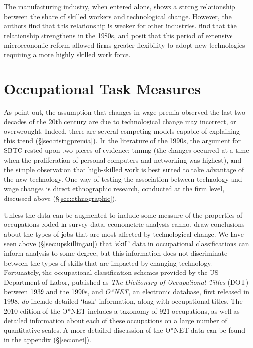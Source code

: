 The manufacturing industry, when entered alone, shows a strong relationship between the share of skilled workers and technological change. However, the authors find that this relationship is weaker for other industries.  find that the relationship strengthens in the 1980s, and posit that this period of extensive microeconomic reform allowed firms greater flexibility to adopt new technologies requiring a more highly skilled work force.


\section{Occupational Task Measures}

As \citet{DiNardo1997} point out, the assumption that changes in wage premia observed the last two decades of the 20th century are due to technological change may incorrect, or overwrought. Indeed, there are several competing models capable of explaining this trend (\S\ref{sec:risingpremia}). In the literature of the 1990s, the argument for SBTC rested upon two pieces of evidence: timing (the changes occurred at a time when the proliferation of personal computers and networking was highest), and the simple observation that high-skilled work is best suited to take advantage of the new technology. One way of testing the association between technology and wage changes is direct ethnographic research, conducted at the firm level, discussed above (\S\ref{sec:ethnographic}).

Unless the data can be augmented to include some measure of the properties of occupations coded in survey data, econometric analysis cannot draw conclusions about the types of jobs that are most affected by technological change. We have seen above (\S\ref{sec:upskillingau}) that `skill' data in occupational classifications can inform analysis to some degree, but this information does not discriminate between the types of skills that are impacted by changing technology. Fortunately, the occupational classification schemes provided by the US Department of Labor, published as {\em The Dictionary of Occupational Titles} (DOT) between 1939 and the 1990s, and {\em O*NET}, an electronic database, first released in 1998, {\em do} include detailed `task' information, along with occupational titles. The 2010 edition of the O*NET includes a taxonomy of 921 occupations, as well as detailed information about each of these occupations on a large number of quantitative scales. A more detailed discussion of the O*NET data can be found in the appendix (\S\ref{sec:onet}).

